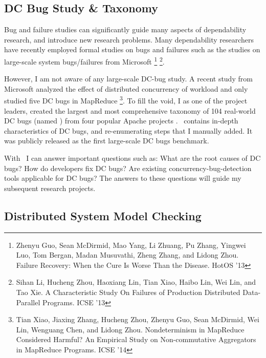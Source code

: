 \documentclass[11pt]{article}
\begin{document}
\subsection{DC Bug Study \& Taxonomy} 

Bug and failure studies can significantly guide many aspects of dependability
research, and introduce new research problems. Many dependability researchers
have recently employed formal studies on bugs and failures such as the studies
on large-scale system bugs/failures from Microsoft \footnote{Zhenyu Guo, Sean
McDirmid, Mao Yang, Li Zhuang, Pu Zhang, Yingwei Luo, Tom Bergan, Madan
Musuvathi, Zheng Zhang, and Lidong Zhou.  Failure Recovery: When the Cure Is
Worse Than the Disease. HotOS '13} \footnote{Sihan Li, Hucheng Zhou, Haoxiang
Lin, Tian Xiao, Haibo Lin, Wei Lin, and Tao Xie. A Characteristic Study On
Failures of Production Distributed Data-Parallel Programs. ICSE '13}.

However, I am not aware of any large-scale DC-bug study. A recent study from
Microsoft analyzed the effect of distributed concurrency of workload and only
studied five DC bugs in MapReduce \footnote{Tian Xiao, Jiaxing Zhang, Hucheng
Zhou, Zhenyu Guo, Sean McDirmid, Wei Lin, Wenguang Chen, and Lidong Zhou.
Nondeterminism in MapReduce Considered Harmful?  An Empirical Study on
Non-commutative Aggregators in MapReduce Programs. ICSE '14}. To fill the void,
I as one of the project leaders, created the largest and most comprehensive
taxonomy of 104 real-world DC bugs (named \taxdc) from four popular Apache
projects \cite{Leesatapornwongsa+16-TaxDC}. \taxdc\ contains in-depth
characteristics of DC bugs, and re-enumerating steps that I manually added.  It
was publicly released as the first large-scale DC bugs benchmark.


With \taxdc\, I can answer important questions such as: 
What are the root causes of DC bugs?
How do developers fix DC bugs? 
Are existing concurrency-bug-detection tools applicable for DC bugs? 
The answers to these questions will guide my subsequent research projects.

\subsection{Distributed System Model Checking}
\end{document}
